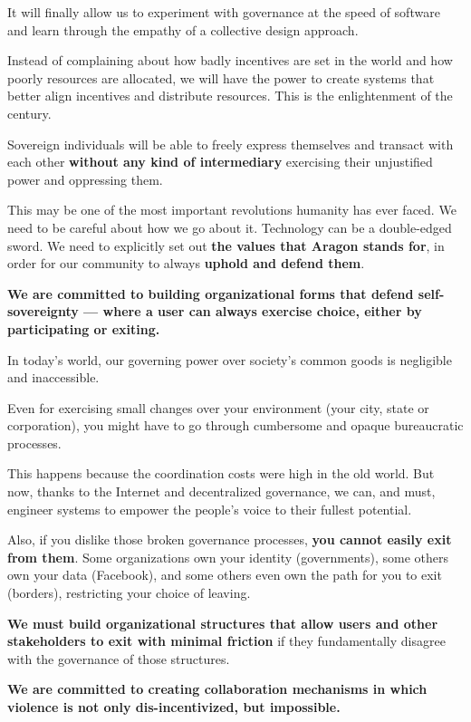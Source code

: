 It will finally allow us to experiment with governance at the speed of software and learn through the empathy of a collective design approach.

Instead of complaining about how badly incentives are set in the world and how poorly resources are allocated, we will have the power to create systems that better align incentives and distribute resources. This is the enlightenment of the century.

Sovereign individuals will be able to freely express themselves and transact with each other \textbf{without any kind of intermediary} exercising their unjustified power and oppressing them.

This may be one of the most important revolutions humanity has ever faced. We need to be careful about how we go about it. Technology can be a double-edged sword. We need to explicitly set out \textbf{the values that Aragon stands for}, in order for our community to always \textbf{uphold and defend them}.

\textbf{We are committed to building organizational forms that defend self-sovereignty — where a user can always exercise choice, either by participating or exiting.}

In today's world, our governing power over society's common goods is negligible and inaccessible.

Even for exercising small changes over your environment (your city, state or corporation), you might have to go through cumbersome and opaque bureaucratic processes.

This happens because the coordination costs were high in the old world. But now, thanks to the Internet and decentralized governance, we can, and must, engineer systems to empower the people's voice to their fullest potential.

Also, if you dislike those broken governance processes, \textbf{you cannot easily exit from them}. 
Some organizations own your identity (governments), some others own your data (Facebook), and some others even own the path for you to exit (borders), restricting your choice of leaving.

\textbf{We must build organizational structures that allow users and other stakeholders to exit with minimal friction} if they fundamentally disagree with the governance of those structures.

\textbf{We are committed to creating collaboration mechanisms in which violence is not only dis-incentivized, but impossible.}


